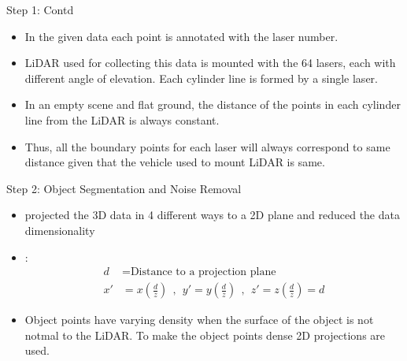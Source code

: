 \documentclass[9pt]{beamer}
\begin{document}
\begin{frame}[fragile]{Step 1: Contd}
	\begin{itemize}
		\item In the given data each point is annotated with the laser number.
		\item LiDAR used for collecting this data is mounted with the 64 lasers, each with different angle of elevation. Each cylinder line is formed by a single laser.
		\item In an empty scene and flat ground, the distance of the points in each cylinder line from the LiDAR is always constant.
		\item Thus, all the boundary points for each laser will always correspond to same distance given that the vehicle used to mount LiDAR is same.
	\end{itemize}
\end{frame}


\begin{frame}[fragile]{Step 2: Object Segmentation and Noise Removal}
	\begin{itemize}
		\item {} projected the 3D data in 4 different ways to a 2D plane and reduced the data dimensionality

		\item {}:
		\begin{align*}
		d  & = \text{Distance to a projection plane} \\
		x' & =  x (\frac{d}{z}) \ \  , \ \  y' =  y (\frac{d}{z}) \ \  , \ \  z'=  z (\frac{d}{z}) = d
		\end{align*}

		\item Object points have varying density when the surface of the object is not notmal to the LiDAR. To make the object points dense 2D projections are used.
	\end{itemize}
\end{frame}


\end{document}
